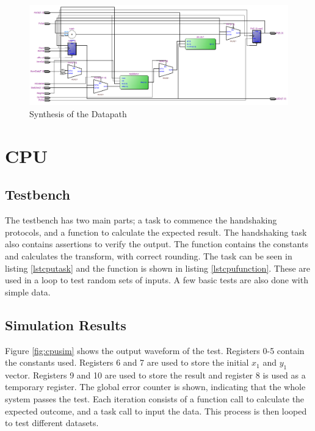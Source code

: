 \begin{figure}
\includegraphics[width=\textwidth]{Figures/datapathsynth.png}
\caption{Synthesis of the Datapath}
\label{fig:datapathsynth}
\end{figure}


\section{CPU}
\subsection{Testbench}

The testbench has two main parts; a task to commence the handshaking protocols, and a function to calculate the expected result. 
The handshaking task also contains assertions to verify the output. 
The function contains the constants and calculates the transform, with correct rounding.
The task can be seen in listing \ref{lstcputask} and the function is shown in listing \ref{lstcpufunction}.
These are used in a loop to test random sets of inputs. 
A few basic tests are also done with simple data. 







\subsection{Simulation Results}

Figure \ref{fig:cpusim} shows the output waveform of the test. 
Registers 0-5 contain the constants used. 
Registers 6 and 7 are used to store the initial $x_1$ and $y_1$ vector. 
Registers 9 and 10 are used to store the result and register 8 is used as a temporary register. 
The global error counter is shown, indicating that the whole system passes the test. 
Each iteration consists of a function call to calculate the expected outcome, and a task call to input the data. 
This process is then looped to test different datasets. 

